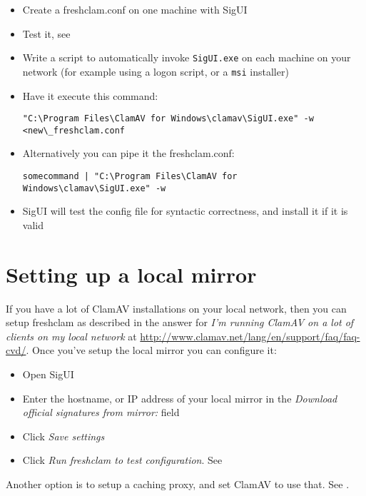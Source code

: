 \begin{itemize}
\begin{itemize}
\item Create a \gls{freshclam.conf} on one machine with \gls{SigUI}
\item Test it, see 
\item Write a script to automatically invoke \verb+SigUI.exe+ on each machine on your network (for example using a logon script, or a \verb+msi+ installer)
\item Have it execute this command:
\begin{verbatim}
"C:\Program Files\ClamAV for Windows\clamav\SigUI.exe" -w <new\_freshclam.conf
\end{verbatim}
\item Alternatively you can pipe it the freshclam.conf:
\begin{verbatim}
somecommand | "C:\Program Files\ClamAV for Windows\clamav\SigUI.exe" -w
\end{verbatim}

\item SigUI will test the config file for syntactic correctness, and install it if it is valid
\end{itemize}
\end{itemize}

\section{Setting up a local mirror}
\label{sec:localmirror}

If you have a lot of ClamAV installations on your local network, then you can setup \gls{freshclam} as described in the answer for  \emph{I’m running ClamAV on a lot of clients on my local network} at \url{http://www.clamav.net/lang/en/support/faq/faq-cvd/}.
Once you've setup the local mirror you can configure it:
\begin{itemize}
\item Open SigUI
\item Enter the hostname, or IP address of your local mirror in the \emph{Download official signatures from mirror:} field
\item Click \emph{Save settings}
\item Click \emph{Run freshclam to test configuration}. See 
\end{itemize}

Another option is to setup a caching proxy, and set ClamAV to use that. See .
